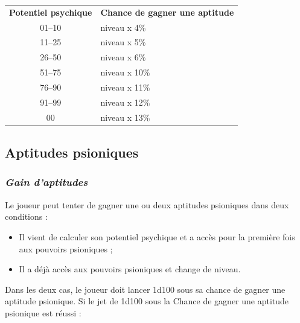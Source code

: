 \documentclass[11pt]{article}
\begin{document}
{{\parindent3cm\begin{tabular}{cl}
\textbf{Potentiel psychique} & \textbf{Chance de gagner une aptitude} \\
01--10 & niveau x 4\% \\
11--25 & niveau x 5\% \\
26--50 & niveau x 6\% \\
51--75 & niveau x 10\% \\
76--90 & niveau x 11\% \\
91--99 & niveau x 12\% \\
\hspace{0.4cm}00 & niveau x 13\% \\
\end{tabular}}

\subsection*{Aptitudes psioniques}

\subsubsection*{\textit{Gain d'aptitudes}}
\label{aptitudes-gain}

Le joueur peut tenter de gagner une ou deux aptitudes psioniques dans deux conditions :

\bigskip

\begin{itemize}
\item Il vient de calculer son potentiel psychique et a accès pour la première fois aux pouvoirs psioniques ;
\item Il a déjà accès aux pouvoirs psioniques et change de niveau.
\end{itemize}

\bigskip

Dans les deux cas, le joueur doit lancer 1d100 sous sa chance de gagner une aptitude psionique. Si le jet de 1d100 sous la Chance de gagner une aptitude psionique est réussi :

\bigskip

}
\end{document}
